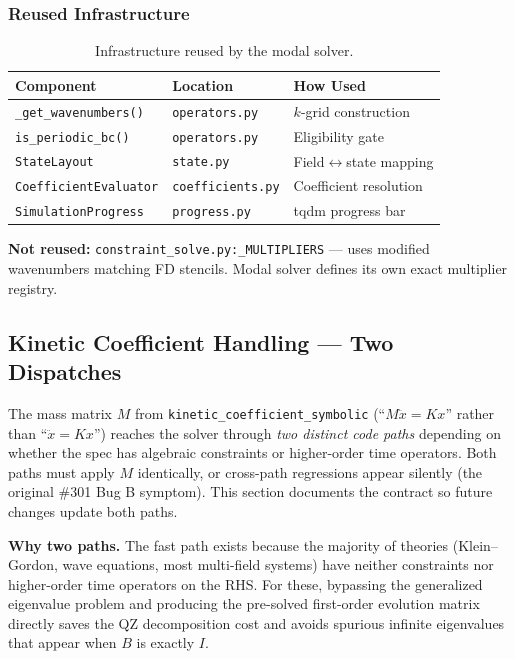 \subsubsection{Reused Infrastructure}
\label{sec:modal-reused}

\begin{table}[htbp]
\centering
\caption{Infrastructure reused by the modal solver.}
\label{tab:modal-reused}
\begin{tabular}{@{}lll@{}}
\toprule
Component & Location & How Used \\
\midrule
\texttt{\_get\_wavenumbers()} & \texttt{operators.py} & $k$-grid construction \\
\texttt{is\_periodic\_bc()} & \texttt{operators.py} & Eligibility gate \\
\texttt{StateLayout} & \texttt{state.py} & Field$\leftrightarrow$state mapping \\
\texttt{CoefficientEvaluator} & \texttt{coefficients.py} & Coefficient resolution \\
\texttt{SimulationProgress} & \texttt{progress.py} & tqdm progress bar \\
\bottomrule
\end{tabular}
\end{table}

\textbf{Not reused:} \texttt{constraint\_solve.py:\_MULTIPLIERS} --- uses modified wavenumbers matching FD stencils. Modal solver defines its own exact multiplier registry.

\subsection{Kinetic Coefficient Handling --- Two Dispatches}
\label{sec:modal-kinetic-dispatches}

The mass matrix $M$ from \texttt{kinetic\_coefficient\_symbolic} (``$M \ddot{x} = K x$'' rather than ``$\ddot{x} = K x$'') reaches the solver through \emph{two distinct code paths} depending on whether the spec has algebraic constraints or higher-order time operators. Both paths must apply $M$ identically, or cross-path regressions appear silently (the original \#301 Bug B symptom). This section documents the contract so future changes update both paths.

\textbf{Why two paths.} The fast path exists because the majority of theories (Klein--Gordon, wave equations, most multi-field systems) have neither constraints nor higher-order time operators on the RHS. For these, bypassing the generalized eigenvalue problem and producing the pre-solved first-order evolution matrix directly saves the QZ decomposition cost and avoids spurious infinite eigenvalues that appear when $B$ is exactly $I$.

